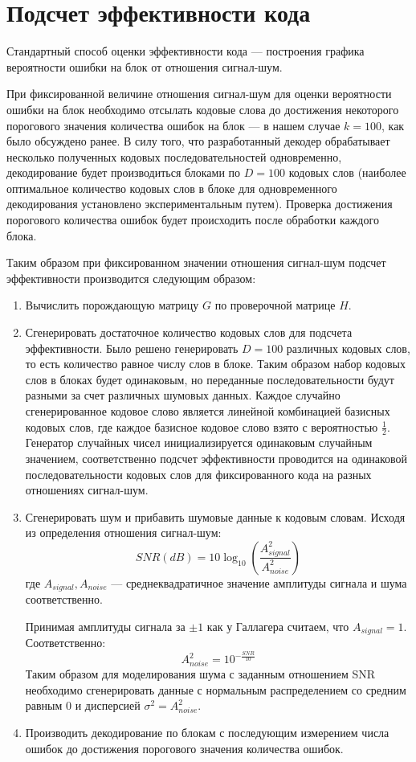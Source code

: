 \section{Подсчет эффективности кода}

Стандартный способ оценки эффективности кода --- построения
графика вероятности ошибки на блок от отношения сигнал-шум.

При фиксированной величине отношения сигнал-шум для оценки вероятности
ошибки на блок необходимо отсылать кодовые слова до достижения некоторого порогового
значения количества ошибок на блок --- в нашем случае $k=100$, как было обсуждено ранее.
В силу того, что разработанный декодер обрабатывает несколько полученных
кодовых последовательностей одновременно, декодирование будет производиться
блоками по $D=100$ кодовых слов (наиболее оптимальное количество кодовых слов в блоке для 
одновременного декодирования установлено экспериментальным путем).
Проверка достижения порогового количества ошибок будет происходить после
обработки каждого блока.

Таким образом при фиксированном значении отношения сигнал-шум подсчет эффективности
производится следующим образом:

\begin{enumerate}
	\item Вычислить порождающую матрицу $G$ по проверочной матрице $H$.
	\item Сгенерировать достаточное количество кодовых слов для подсчета эффективности.
	Было решено генерировать $D=100$ различных кодовых слов, то есть количество равное числу слов в
	блоке. Таким образом набор кодовых слов в блоках будет одинаковым, но переданные последовательности
	будут разными за счет различных шумовых данных.
	Каждое случайно сгенерированное кодовое слово является линейной комбинацией базисных кодовых
	слов, где каждое базисное кодовое слово взято с вероятностью $\frac{1}{2}$. Генератор случайных 
	чисел инициализируется одинаковым случайным значением, соответственно подсчет эффективности
	проводится на одинаковой последовательности кодовых слов для фиксированного кода на разных
	отношениях сигнал-шум.
	\item Сгенерировать шум и прибавить шумовые данные к кодовым словам. Исходя из определения
	отношения сигнал-шум:
	\[
		SNR(dB)=10\log_{10}\left(\frac{A_{signal}^2}{A_{noise}^2}\right)
	\]
	где $A_{signal},A_{noise}$ --- среднеквадратичное значение амплитуды сигнала и шума соответственно. 
	
	Принимая амплитуды сигнала за $\pm1$ как у Галлагера считаем, что $A_{signal}=1$. Соответственно:
	\[
		A_{noise}^2 = 10^{-\frac{SNR}{10}} 
	\]
	Таким образом для моделирования шума с заданным отношением SNR необходимо сгенерировать
	данные с нормальным распределением со средним равным $0$ и дисперсией $\sigma^2=A_{noise}^2$.
	\item Производить декодирование по блокам с последующим измерением числа ошибок до достижения
	порогового значения количества ошибок.
\end{enumerate}

